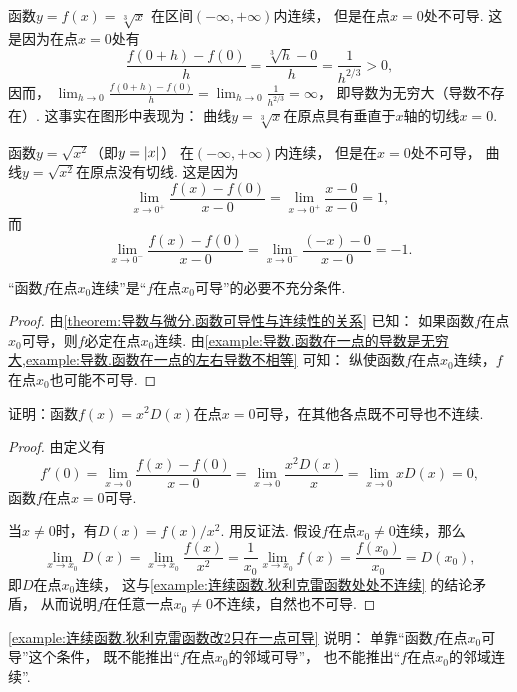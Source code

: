 \begin{example}\label{example:导数.函数在一点的导数是无穷大}
函数\(y=f(x)=\sqrt[3]x\)
在区间\((-\infty,+\infty)\)内连续，
但是在点\(x=0\)处不可导.
这是因为在点\(x=0\)处有\[
	\frac{f(0+h)-f(0)}{h}
	=\frac{\sqrt[3]{h}-0}{h}
	=\frac{1}{h^{2/3}}>0,
\]
因而，
\(\lim_{h\to0} \frac{f(0+h)-f(0)}{h}
=\lim_{h\to0} \frac{1}{h^{2/3}}
=\infty\)，
即导数为无穷大（导数不存在）.
这事实在图形中表现为：
曲线\(y=\sqrt[3]x\)在原点具有垂直于\(x\)轴的切线\(x=0\).
\end{example}

\begin{example}\label{example:导数.函数在一点的左右导数不相等}
函数\(y=\sqrt{x^2}\)（即\(y=\abs{x}\)）
在\((-\infty,+\infty)\)内连续，
但是在\(x=0\)处不可导，
曲线\(y=\sqrt{x^2}\)在原点没有切线.
这是因为\[
	\lim_{x\to0^+} \frac{f(x)-f(0)}{x-0}
	= \lim_{x\to0^+} \frac{x-0}{x-0}
	= 1,
\]
而\[
	\lim_{x\to0^-} \frac{f(x)-f(0)}{x-0}
	= \lim_{x\to0^-} \frac{(-x)-0}{x-0}
	= -1.
\]
\end{example}

\begin{theorem}
“函数\(f\)在点\(x_0\)连续”是“\(f\)在点\(x_0\)可导”的必要不充分条件.
\begin{proof}
由\cref{theorem:导数与微分.函数可导性与连续性的关系} 已知：
如果函数\(f\)在点\(x_0\)可导，则\(f\)必定在点\(x_0\)连续.
由\cref{example:导数.函数在一点的导数是无穷大,example:导数.函数在一点的左右导数不相等} 可知：
纵使函数\(f\)在点\(x_0\)连续，\(f\)在点\(x_0\)也可能不可导.
\end{proof}
\end{theorem}

\begin{example}\label{example:连续函数.狄利克雷函数改2只在一点可导}
证明：函数\(f(x) = x^2 D(x)\)在点\(x=0\)可导，在其他各点既不可导也不连续.
\begin{proof}
由定义有\[
	f'(0) = \lim_{x\to0} \frac{f(x) - f(0)}{x - 0}
	= \lim_{x\to0} \frac{x^2 D(x)}{x}
	= \lim_{x\to0} x D(x)
	= 0,%
\]
函数\(f\)在点\(x=0\)可导.

当\(x\neq0\)时，有\(D(x) = f(x) / x^2\).
用反证法.
假设\(f\)在点\(x_0\neq0\)连续，那么\[
	\lim_{x \to x_0} D(x)
	= \lim_{x \to x_0} \frac{f(x)}{x^2}
	= \frac1{x_0} \lim_{x \to x_0} f(x)
	= \frac{f(x_0)}{x_0}
	= D(x_0),
\]
即\(D\)在点\(x_0\)连续，
这与\cref{example:连续函数.狄利克雷函数处处不连续} 的结论矛盾，
从而说明\(f\)在任意一点\(x_0\neq0\)不连续，自然也不可导.
\end{proof}
\end{example}
\begin{remark}
\cref{example:连续函数.狄利克雷函数改2只在一点可导} 说明：
单靠“函数\(f\)在点\(x_0\)可导”这个条件，
既不能推出“\(f\)在点\(x_0\)的邻域可导”，
也不能推出“\(f\)在点\(x_0\)的邻域连续”.
\end{remark}

